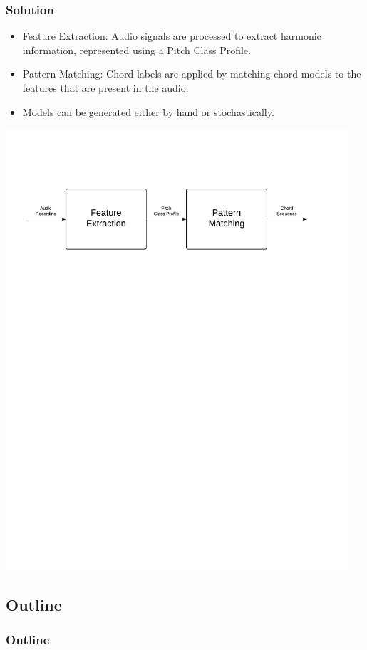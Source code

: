 \documentclass{beamer}
\begin{document}
\begin{frame}
	\frametitle{Solution}
	
	\begin{itemize}
		\item Feature Extraction: Audio signals are processed to extract harmonic information, represented using a Pitch Class Profile.
		\item Pattern Matching: Chord labels are applied by matching chord models to the features that are present in the audio. 
		\item Models can be generated either by hand or stochastically.
	\end{itemize}
	\includegraphics[width=0.95\textwidth]{ChordRecognition.pdf}
\end{frame}

\subsection*{Outline}

\begin{frame}
  \frametitle{Outline}
  \tableofcontents[hideallsubsections]
\end{frame}
\end{document}

